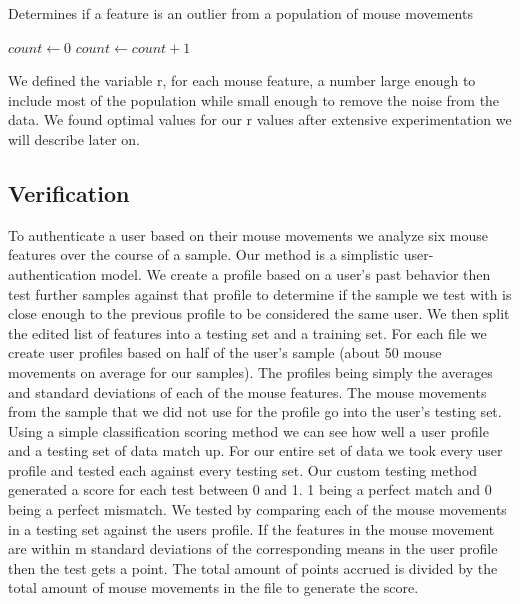 \documentclass[conference]{IEEEtran}
\begin{document}
\begin{algorithm}
\caption{Determines if a feature is an outlier from a population of mouse movements}\label{euclid}
\begin{algorithmic}[1]
\State $\textit{count} \gets 0$
				\State $count \gets count + 1$
			\EndIf
		\EndIf
	\EndFor
		\State {}
	\Else
		\State {}
	\EndIf
\EndProcedure
\end{algorithmic}
\end{algorithm}

We defined the variable r, for each mouse feature, a number large enough to include most of the population while small enough to remove the noise from the data. We found optimal values for our r values after extensive experimentation we will describe later on.

\subsection{Verification}
	To authenticate a user based on their mouse movements we analyze six mouse features over the course of a sample. Our method is a simplistic user-authentication model. We create a profile based on a user's past behavior then test further samples against that profile to determine if the sample we test with is close enough to the previous profile to be considered the same user.  
We then split the edited list of features into a testing set and a training set. For each file we create user profiles based on half of the user's sample (about 50 mouse movements on average for our samples). The profiles being simply the averages and standard deviations of each of the mouse features. The mouse movements from the sample that we did not use for the profile go into the user's testing set.
Using a simple classification scoring method we can see how well a user profile and a testing set of data match up. For our entire set of data we took every user profile and tested each against every testing set. Our custom testing method generated a score for each test between 0 and 1. 1 being a perfect match and 0 being a perfect mismatch.
We tested by comparing each of the mouse movements in a testing set against the users profile. If the features in the mouse movement are within m standard deviations of the corresponding means in the user profile then the test gets a point. The total amount of points accrued is divided by the total amount of mouse movements in the file to generate the score.
	
\end{document}
